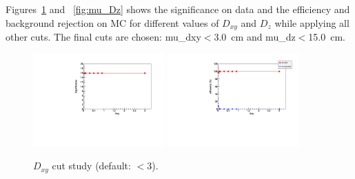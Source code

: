 Figures~\ref{fig:mu_Dxy} and ~\ref{fig:mu_Dz} shows the significance on data and the efficiency and background rejection 
on MC for different values of $D_{xy}$ and $D_z$ while applying all other cuts. The final cuts are chosen:
 mu\_dxy$<$3.0~cm and mu\_dz$<$15.0~cm.
%
\begin{figure}[h!]
 \begin{center}
   \includegraphics[angle=0,width=0.45\textwidth]{chap_YInPbPbColl2011_figures/Dxy_Significance1} 
   \includegraphics[angle=0,width=0.45\textwidth]{chap_YInPbPbColl2011_figures/Dxy_SigBkgRejEff}
   \caption{$D_{xy}$ cut study  (default: $<3$).} %
   \label{fig:mu_Dxy}
 \end{center}
\end{figure}
%
